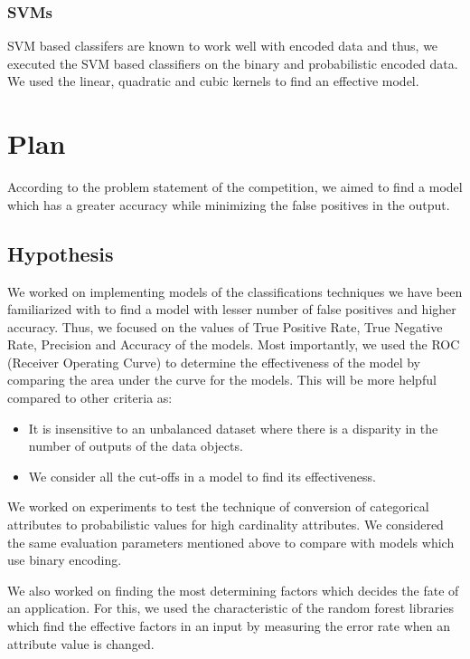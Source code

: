 \documentclass{article} %
\begin{document}
	\subsubsection{SVMs}
	SVM based classifers are known to work well with encoded data and thus, we executed the SVM based classifiers on the binary and probabilistic encoded data. We used the linear, quadratic and cubic kernels to find an effective model. 
	
	\section{Plan}
	According to the problem statement of the competition, we aimed to find a model which has a greater accuracy while minimizing the false positives in the output.
	
	\subsection{Hypothesis}
	We worked on implementing models of the classifications techniques we have been familiarized with to find a model with lesser number of false positives and higher accuracy. Thus, we focused on the values of True Positive Rate, True Negative Rate, Precision and Accuracy of the models. Most importantly, we used the ROC (Receiver Operating Curve) to determine the effectiveness of the model by comparing the area under the curve for the models. This will be more helpful compared to other criteria as:
	\begin{itemize}
		\item It is insensitive to an unbalanced dataset where there is a disparity in the number of outputs of the data objects.  
		\item We consider all the cut-offs in a model to find its effectiveness.
	\end{itemize}
	
	We worked on experiments to test the technique of conversion of categorical attributes to probabilistic values for high cardinality attributes\cite{HighCard}. We considered the same evaluation parameters mentioned above to compare with models which use binary encoding. 
	
	We also worked on finding the most determining factors which decides the fate of an application. For this, we used the characteristic of the random forest libraries which find the effective factors in an input by measuring the error rate when an attribute value is changed. 
\end{document}
